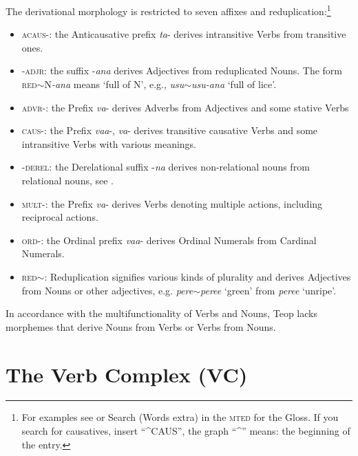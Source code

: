 \documentclass[output=paper]{langscibook}
\begin{document}
The derivational morphology is restricted to seven affixes and reduplication:\footnote{For examples see \textcite[258--260]{Mosel:2007ng} or  Search (Words extra) in the \textsc{mted} for the Gloss. If you search for causatives, insert ``{\^{}}CAUS'', the graph ``{\^{}}'' means: the beginning of the entry.}
\begin{itemize}
    \item \textsc{acaus}-: the Anticausative prefix \textit{ta}- derives intransitive Verbs from transitive ones.
    \item -\textsc{adjr}: the suffix -\textit{ana} derives Adjectives from reduplicated Nouns. The form \textsc{red}{$\sim$}N\textit{-ana} means `full of N', e.g., \textit{usu{$\sim$}usu-ana} `full of lice'.
    \item \textsc{advr}-: the Prefix \textit{va}- derives Adverbs from Adjectives and some stative Verbs
    \item \textsc{caus}-: the Prefix \textit{vaa}-, \textit{va}- derives transitive causative Verbs and some intransitive Verbs with various meanings.
    \item -\textsc{derel}: the Derelational suffix -\textit{na} derives non-relational nouns from relational nouns, see .
    \item \textsc{mult}-: the Prefix \textit{va}- derives Verbs denoting multiple actions, including reciprocal actions.
    \item \textsc{ord}-: the Ordinal prefix \textit{vaa}- derives Ordinal Numerals from Cardinal Numerals.
    \item \textsc{red}{$\sim$}: Reduplication signifies various kinds of plurality and derives Adjectives from Nouns or other adjectives, e.g. \textit{pere{$\sim$}peree} `green' from \textit{peree} `unripe'.
\end{itemize}
In accordance with the multifunctionality of Verbs and Nouns, Teop lacks morphemes that derive Nouns from Verbs or Verbs from Nouns.
\section{The Verb Complex (VC)}\label{sec:vc}
\end{document}
